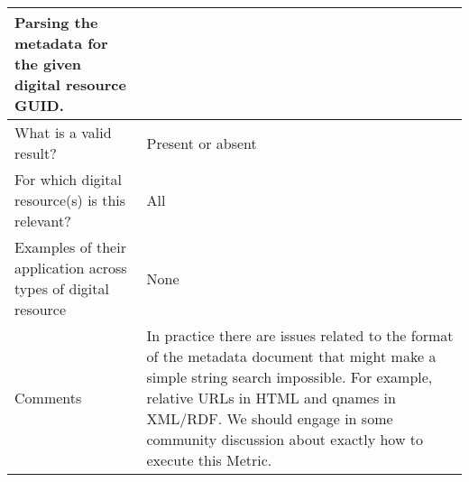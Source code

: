 \documentclass[english]{article}
\begin{document}
\begin{longtable}{|p{5cm}|p{9cm}|}
Parsing the metadata for the given digital resource GUID.

\\



\hline
What is a valid result? &  


Present or absent


\\



\hline
For which digital resource(s) is this relevant? &  All\\



\hline
Examples of their application across types of digital resource &  

None


\\



\hline

Comments & 


In practice there are issues related to the format of the metadata document that might make a simple string search impossible.  For example, relative URLs in HTML and qnames in XML/RDF.  We should engage in some community discussion about exactly how to execute this Metric.

 \\ 
\hline

\end{longtable}






\newpage
\end{document}
